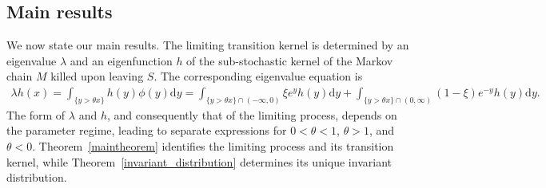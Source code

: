 \documentclass[10pt,a4paper]{amsart}
\newcommand{\1}{\mathds{1}}
\renewcommand{\d}{\mathrm{d}}
\begin{document}
\subsection{Main results}
We now state our main results. The limiting transition kernel is determined by an eigenvalue $\lambda$ and an eigenfunction $h$ of the
sub-stochastic kernel of the Markov chain $M$ killed upon leaving $S$. The
corresponding eigenvalue equation is
\begin{align}\label{eq_eigenfunction}
    \lambda h(x)=\int_{\{y>\theta x\}}\!\!\!\!\!\!\!h(y)\phi(y)\d y=\int_{\{y>\theta x\}\cap(-\infty,0)}\!\!\!\!\!\!\!\xi  e^yh(y)\d y+\int_{\{y>\theta x\}\cap(0,\infty)}\!\!\!\!\!\!\!(1-\xi)  e^{-y}h(y)\d y.
\end{align}
The form of $\lambda$ and $h$, and consequently that of the limiting process, depends on
the parameter regime, leading to separate expressions for $0<\theta<1$,
$\theta>1$, and $\theta<0$. Theorem~\ref{maintheorem} identifies the
limiting process and its transition kernel, while
Theorem~\ref{invariant_distribution} determines its unique invariant
distribution.
\end{document}
